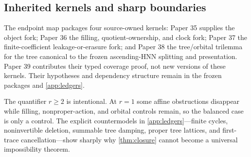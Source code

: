 \subsection{Inherited kernels and sharp boundaries}

The endpoint map packages four source-owned kernels: Paper 35 supplies the
object fork; Paper 36 the filling, quotient-ownership, and clock fork; Paper 37
the finite-coefficient leakage-or-erasure fork; and Paper 38 the tree/orbital
trilemma for the tree canonical to the frozen ascending-HNN splitting and
presentation.  Paper 39 contributes their typed coverage proof, not new
versions of these kernels.  Their hypotheses and dependency structure remain
in the frozen packages and \cref{app:ledgers}.

The quantifier $r\ge2$ is intentional.  At $r=1$ some affine obstructions
disappear while filling, nonproper-action, and orbital controls remain, so the
balanced case is only a control.  The explicit countermodels in
\cref{app:ledgers}---finite cycles, noninvertible deletion, summable tree
damping, proper tree lattices, and first-trace cancellation---show sharply why
\cref{thm:closure} cannot become a universal impossibility theorem.
